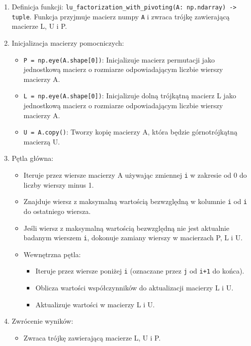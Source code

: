 \documentclass[9pt]{article}
\begin{document}
\begin{enumerate}
    \item Definicja funkcji: \texttt{lu\_factorization\_with\_pivoting(A: np.ndarray) -> tuple}. Funkcja przyjmuje macierz numpy \texttt{A} i zwraca trójkę zawierającą macierze L, U i P.
    \item Inicjalizacja macierzy pomocniczych:
    \begin{itemize}
        \item \texttt{P = np.eye(A.shape[0])}: Inicjalizuje macierz permutacji jako jednostkową macierz o rozmiarze odpowiadającym liczbie wierszy macierzy A.
        \item \texttt{L = np.eye(A.shape[0])}: Inicjalizuje dolną trójkątną macierz L jako jednostkową macierz o rozmiarze odpowiadającym liczbie wierszy macierzy A.
        \item \texttt{U = A.copy()}: Tworzy kopię macierzy A, która będzie górnotrójkątną macierzą U.
    \end{itemize}
    \item Pętla główna:
    \begin{itemize}
        \item Iteruje przez wiersze macierzy A używając zmiennej \texttt{i} w zakresie od 0 do liczby wierszy minus 1.
        \item Znajduje wiersz z maksymalną wartością bezwzględną w kolumnie \texttt{i} od \texttt{i} do ostatniego wiersza.
        \item Jeśli wiersz z maksymalną wartością bezwzględną nie jest aktualnie badanym wierszem \texttt{i}, dokonuje zamiany wierszy w macierzach P, L i U.
        \item Wewnętrzna pętla:
        \begin{itemize}
            \item Iteruje przez wiersze poniżej \texttt{i} (oznaczane przez \texttt{j} od \texttt{i+1} do końca).
            \item Oblicza wartości współczynników do aktualizacji macierzy L i U.
            \item Aktualizuje wartości w macierzy L i U.
        \end{itemize}
    \end{itemize}
    \item Zwrócenie wyników:
    \begin{itemize}
        \item Zwraca trójkę zawierającą macierze L, U i P.
    \end{itemize}
\end{enumerate}
\end{document}
